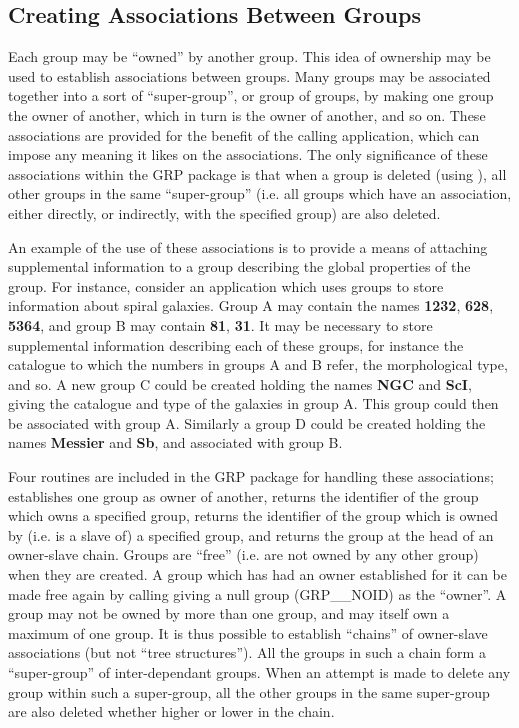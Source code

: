 \subsection{\label{SEC:OWN}Creating Associations Between Groups}

Each group may be ``owned'' by another group. This idea of ownership may be
used to
establish associations between groups. Many groups may be associated together
into a sort of ``super-group'', or group of groups, by making one group the
owner of another, which in turn is the owner of another, and so on. These
associations are provided for the benefit of the calling application, which can
impose any meaning it likes on the associations. The only significance of these
associations within the GRP package is that when a group is deleted (using
), all other groups in the same ``super-group'' (i.e. all groups which
have an association, either directly, or indirectly, with the specified group)
are also deleted.

An example of the use of these associations is to provide a means of attaching
supplemental information to a group describing the global properties of the
group. For instance, consider an application which uses groups to store
information about spiral galaxies. Group A may contain the names {\bf 1232},
{\bf 628}, {\bf 5364}, and group B may contain {\bf 81}, {\bf 31}. It may be
necessary to store supplemental information describing each of these groups, for
instance the catalogue to which the numbers in groups A and B refer, the
morphological type, and so. A new group C could be created holding the names
{\bf NGC} and {\bf ScI}, giving the catalogue and type of the galaxies in group
A. This group could then be associated with group A. Similarly a group D could
be created holding the names {\bf Messier} and {\bf Sb}, and associated with
group B.

Four routines are included in the GRP package for handling these
associations;
 establishes one group as owner of another,
 returns the
identifier of the group which owns a specified group,
 returns the
identifier of the group which is owned by (i.e. is a slave of) a specified group,
and  returns the
group at the head of an owner-slave chain. Groups are ``free'' (i.e. are not
owned by any other group) when they are created. A group which has had an owner
established for it can be made free again by calling  giving a null
group (GRP\_\_NOID) as the ``owner''. A group may not be owned by more than one
group, and may itself own a maximum of one group. It is thus possible to
establish ``chains'' of owner-slave associations (but not ``tree structures'').
All the groups in such a chain form a ``super-group'' of inter-dependant groups.
When an attempt is made to delete any group within such a super-group, all the
other groups in the same super-group are also deleted whether higher or lower in
the chain.

